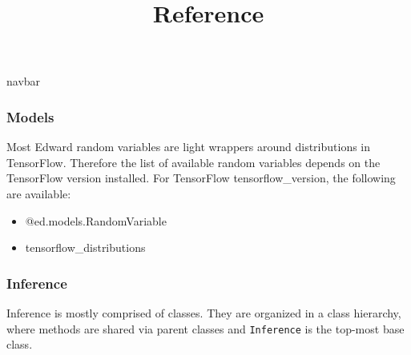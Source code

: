 \title{Reference}

{{navbar}}

\subsubsection{Models}

Most Edward random variables are light wrappers around distributions
in TensorFlow. Therefore the list of available random variables
depends on the TensorFlow version installed. For TensorFlow
{{tensorflow_version}}, the following are available:

\begin{itemize}
  \item @{ed.models.RandomVariable}
  \item {{tensorflow_distributions}}
\end{itemize}

\subsubsection{Inference}

Inference is mostly comprised of classes. They are organized in a
class hierarchy, where methods are shared via parent classes and
\texttt{Inference} is the top-most base class.

